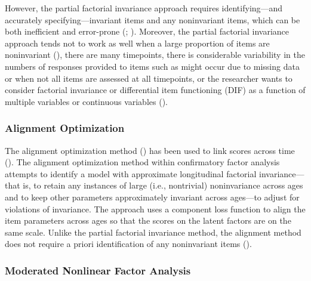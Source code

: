 \documentclass[
  american,
  letterpaper,
  12pt]{article}
\begin{document}
However, the partial factorial invariance approach requires
identifying---and accurately specifying---invariant items and any
noninvariant items, which can be both inefficient and error-prone
(;
). Moreover, the partial factorial
invariance approach tends not to work as well when a large proportion of
items are noninvariant (), there are
many timepoints, there is considerable variability in the numbers of
responses provided to items such as might occur due to missing data or
when not all items are assessed at all timepoints, or the researcher
wants to consider factorial invariance or differential item functioning
(DIF) as a function of multiple variables or continuous variables
().

\subsubsection{Alignment Optimization}\label{alignment-optimization}

The alignment optimization method () has been used to link scores across time
(). The alignment optimization method
within confirmatory factor analysis attempts to identify a model with
approximate longitudinal factorial invariance---that is, to retain any
instances of large (i.e., nontrivial) noninvariance across ages and to
keep other parameters approximately invariant across ages---to adjust
for violations of invariance. The approach uses a component loss
function to align the item parameters across ages so that the scores on
the latent factors are on the same scale. Unlike the partial factorial
invariance method, the alignment method does not require a priori
identification of any noninvariant items ().

\subsubsection{Moderated Nonlinear Factor
Analysis}\label{moderated-nonlinear-factor-analysis}
\end{document}
